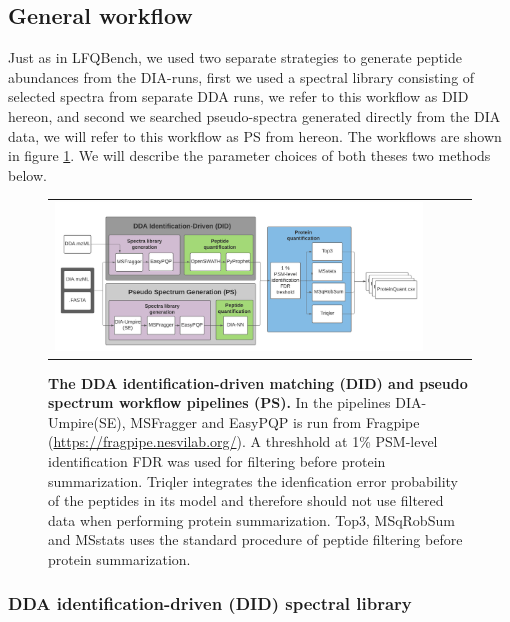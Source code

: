 \documentclass[10pt,letterpaper]{article}
\begin{document}
\subsection*{General workflow}

Just as in LFQBench, we used two separate strategies to generate peptide abundances from the DIA-runs, first we used a spectral library consisting of selected spectra from separate DDA runs, we refer to this workflow as DID hereon, and second we searched pseudo-spectra generated directly from the DIA data, we will refer to this workflow as PS from hereon. The workflows are shown in figure \ref{fig:flowchart}. We will describe the parameter choices of both theses two methods below.

\begin{figure}[htp]
    \centering
    \begin{tabular}{lclc} 


        \includegraphics[width=1.0\linewidth]{../../result/report_plots/DIA_benchmark_truncated.png} 
    \end{tabular}
        \caption{{\bf The DDA identification-driven matching (DID) and pseudo spectrum workflow pipelines (PS).} In the pipelines DIA-Umpire(SE), MSFragger and EasyPQP is run from Fragpipe (\protect\url{https://fragpipe.nesvilab.org/}). A threshhold at 1\% PSM-level identification FDR was used for filtering before protein summarization. Triqler integrates the idenfication error probability of the peptides in its model and therefore should not use filtered data when performing protein summarization. Top3, MSqRobSum and MSstats uses the standard procedure of peptide filtering before protein summarization.}   
      \label{fig:flowchart}
\end{figure}



\subsubsection*{DDA identification-driven (DID) spectral library}
\end{document}
